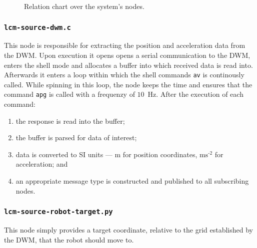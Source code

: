 \begin{figure}[h]
  \centering
  \caption{Relation chart over the system's nodes.}
  \label{fig:node-schema}
\end{figure}

\subsubsection{\texttt{lcm-source-dwm.c}}
This node is responsible for extracting the position and acceleration data from the DWM.
Upon execution it opens opens a serial communication to the DWM, enters the shell mode and allocates a buffer into which received data is read into.
Afterwards it enters a loop within which the shell commands \texttt{av} is continously called.
While spinning in this loop, the node keeps the time and ensures that the command \texttt{apg} is called with a frequenzy of $10$~Hz.
After the execution of each command:
\begin{enumerate}
  \item the response is read into the buffer;
  \item the buffer is parsed for data of interest;
  \item data is converted to SI units --- m for position coordinates, $\text{ms}^{\text{-2}}$ for acceleration; and
  \item an appropriate message type is constructed and published to all subscribing nodes.
\end{enumerate}

\subsubsection{\texttt{lcm-source-robot-target.py}}
This node simply provides a target coordinate, relative to the grid established by the DWM, that the robot should move to.
